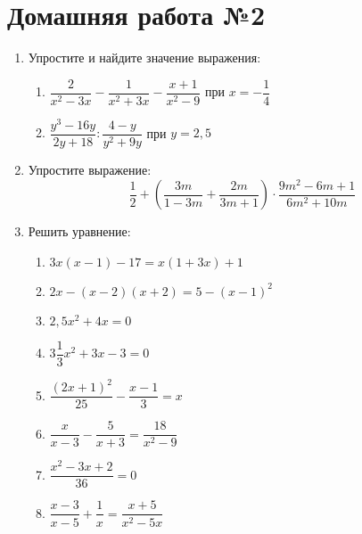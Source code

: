 \documentclass[12pt, a5paper]{article}
\begin{document}
	

\section*{Домашняя работа №2}
\begin{enumerate}
	\item Упростите и найдите значение выражения:
	\begin{enumerate}[label=\asbuk*)]
		\item $\dfrac{2}{x^2-3x}-\dfrac{1}{x^2+3x}-\dfrac{x+1}{x^2-9}$ при $x=-\dfrac{1}{4}$
		\item $\dfrac{y^3-16y}{2y+18}:\dfrac{4-y}{y^2+9y}$ при $y=2,5$
	\end{enumerate}
	\item Упростите выражение: $$\dfrac{1}{2}+\left(\dfrac{3m}{1-3m}+\dfrac{2m}{3m+1}\right)\cdot\dfrac{9m^2-6m+1}{6m^2+10m}$$
	\item Решить уравнение:
	\begin{enumerate}[label=\asbuk*)]
		\item $3x(x-1)-17=x(1+3x)+1$
		\item $2x-(x-2)(x+2)=5-(x-1)^2$
		\item $2,5x^2+4x=0$
		\item $3\dfrac{1}{3}x^2+3x-3=0$
		\item $\dfrac{(2x+1)^2}{25}-\dfrac{x-1}{3}=x$
		\item $\dfrac{x}{x-3}-\dfrac{5}{x+3}=\dfrac{18}{x^2-9}$
		\item $\dfrac{x^2 - 3x +2}{36} = 0$
		\item $\dfrac{x - 3 }{x - 5} + \dfrac{1}{x} = \dfrac{x + 5}{x^2 - 5x}$
	\end{enumerate}
	
\end{enumerate}
\end{document}
